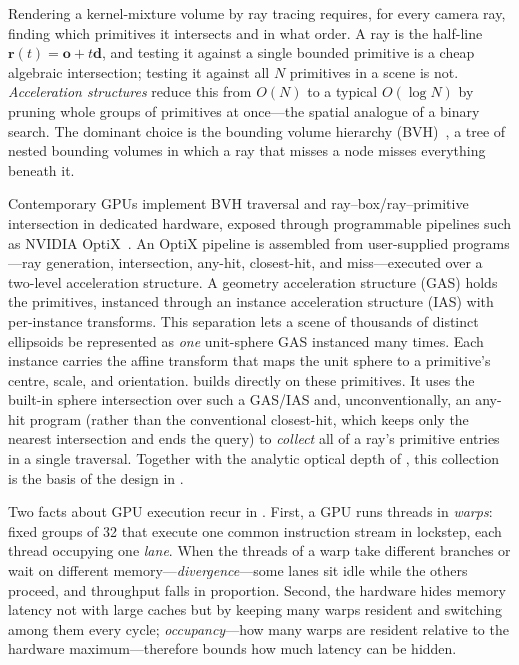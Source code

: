 Rendering a kernel-mixture volume by ray tracing requires, for every camera ray, finding which
primitives it intersects and in what order. A ray is the half-line $\bm{r}(t)=\bm{o}+t\bm{d}$, and
testing it against a single bounded primitive is a cheap algebraic intersection; testing it against
all $N$ primitives in a scene is not. \emph{Acceleration structures} reduce this from $O(N)$ to a typical
$O(\log N)$ by pruning whole groups of primitives at once---the spatial analogue of a binary search.
The dominant choice is the bounding
volume hierarchy (BVH)~\cite{KayKajiya1986,MacDonaldBooth1990}, a tree of nested
bounding volumes in which a ray that misses a node misses everything beneath it.

Contemporary GPUs implement BVH traversal and ray--box/ray--primitive intersection in dedicated
hardware, exposed through programmable pipelines such as NVIDIA OptiX~\cite{Optix}. An OptiX pipeline
is assembled from user-supplied programs---ray generation, intersection, any-hit, closest-hit, and
miss---executed over a two-level acceleration structure. A geometry acceleration structure (GAS)
holds the primitives, instanced through an instance acceleration structure (IAS) with per-instance
transforms. This separation lets a scene of thousands of distinct ellipsoids be represented as
\emph{one} unit-sphere GAS instanced many times. Each instance carries the affine transform that
maps the unit sphere to a primitive's centre, scale, and orientation.  builds
directly on these primitives. It uses the built-in sphere intersection over such a GAS/IAS and,
unconventionally, an any-hit program (rather than the conventional closest-hit, which
keeps only the nearest intersection and ends the query) to \emph{collect} all of a ray's
primitive entries in a single traversal. Together with the analytic optical depth of
, this collection is the basis of the design in .

Two facts about GPU execution recur in . First, a
GPU runs threads in \emph{warps}: fixed groups of \num{32} that execute one common
instruction stream in lockstep, each thread occupying one \emph{lane}. When the threads of
a warp take different branches or wait on different memory---\emph{divergence}---some
lanes sit idle while the others proceed, and throughput falls in proportion. Second, the
hardware hides memory latency not with large caches but by keeping many warps resident and
switching among them every cycle; \emph{occupancy}---how many warps are resident relative
to the hardware maximum---therefore bounds how much latency can be hidden.
